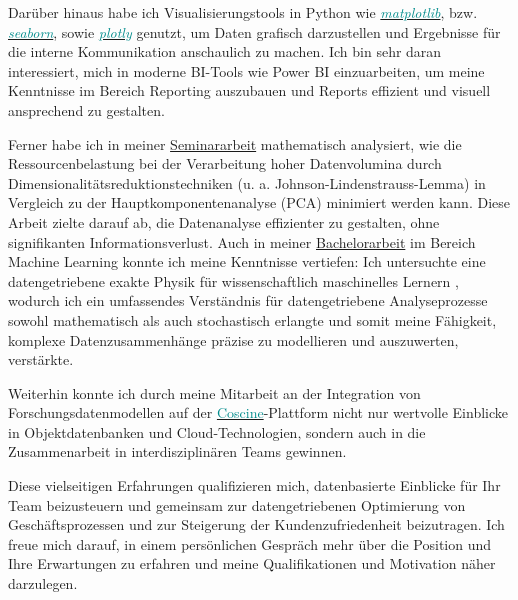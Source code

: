 Darüber hinaus habe ich Visualisierungstools in Python wie \href{https://de.wikipedia.org/wiki/Matplotlib}{\textit{\textcolor{darkcyan}{matplotlib}}}, bzw. \href{https://seaborn.pydata.org/index.html}{\textit{\textcolor{darkcyan}{seaborn}}}, sowie \href{https://en.wikipedia.org/wiki/Plotly}{\textit{\textcolor{darkcyan}{plotly}}} genutzt, um Daten grafisch darzustellen und Ergebnisse für die interne Kommunikation anschaulich zu machen.
Ich bin sehr daran interessiert, mich in moderne BI-Tools wie Power BI einzuarbeiten, um meine Kenntnisse im Bereich Reporting auszubauen und Reports effizient und visuell ansprechend zu gestalten.

Ferner habe ich in meiner \href{https://montahaee.github.io/assets/pdf/de/projects/JLL1_final.pdf}{\textcolor{darkgreencyan}{Seminararbeit}} mathematisch analysiert, wie die Ressourcenbelastung bei der Verarbeitung hoher Datenvolumina durch Dimensionalitätsreduktionstechniken (u. a. Johnson-Lindenstrauss-Lemma)
in Vergleich zu der Hauptkomponentenanalyse (PCA) minimiert werden kann.
Diese Arbeit zielte darauf ab, die Datenanalyse effizienter zu gestalten, ohne signifikanten Informationsverlust.
Auch in meiner \href{https://montahaee.github.io/assets/pdf/de/projects/myFH_Bachelorthesis.pdf}{\textcolor{darkgreencyan}{Bachelorarbeit}} im Bereich Machine Learning konnte ich meine Kenntnisse vertiefen: Ich untersuchte eine datengetriebene exakte Physik für wissenschaftlich maschinelles Lernern , wodurch ich ein umfassendes Verständnis für datengetriebene Analyseprozesse sowohl mathematisch als auch stochastisch erlangte und somit meine Fähigkeit, komplexe Datenzusammenhänge präzise zu modellieren und auszuwerten, verstärkte.

Weiterhin konnte ich durch meine Mitarbeit an der Integration von Forschungsdatenmodellen auf der \href{https://coscine.rwth-aachen.de/login?redirect=/}{\textcolor{darkcyan}{Coscine}}-Plattform nicht nur wertvolle Einblicke in Objektdatenbanken und Cloud-Technologien, sondern auch in die Zusammenarbeit in interdisziplinären Teams gewinnen.

Diese vielseitigen Erfahrungen qualifizieren mich, datenbasierte Einblicke für Ihr Team beizusteuern und gemeinsam zur datengetriebenen Optimierung von Geschäftsprozessen und zur Steigerung der Kundenzufriedenheit beizutragen.
Ich freue mich darauf, in einem persönlichen Gespräch mehr über die Position und Ihre Erwartungen zu erfahren und meine Qualifikationen und Motivation näher darzulegen.

